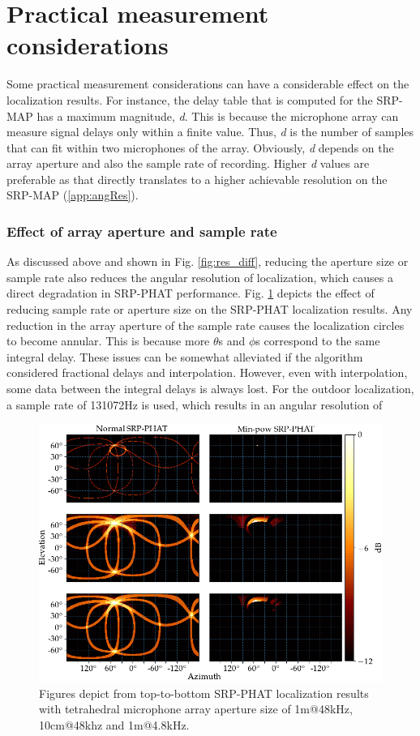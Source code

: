 \section{Practical measurement considerations}
Some practical measurement considerations can have a considerable effect on the localization results. For instance, the delay table that is computed for the SRP-MAP has a maximum magnitude, \textit{d}. This is because the microphone array can measure signal delays only within a finite value. Thus, \textit{d} is the number of samples that can fit within two microphones of the array. Obviously, \textit{d} depends on the array aperture and also the sample rate of recording. Higher \textit{d} values are preferable as that directly translates to a higher achievable resolution on the SRP-MAP (\ref{app:angRes}).
\subsubsection{Effect of array aperture and sample rate}
As discussed above and shown in Fig. \ref{fig:res_diff}, reducing the aperture size or sample rate also reduces the angular resolution of localization, which causes a direct degradation in SRP-PHAT performance. Fig. \ref{fig:4mic1srcAper} depicts the effect of reducing sample rate or aperture size on the SRP-PHAT localization results. Any reduction in the array aperture of the sample rate causes the localization circles to become annular. This is because more $\theta$s and $\phi$s correspond to the same integral delay. These issues can be somewhat alleviated if the algorithm considered fractional delays and interpolation. However, even with interpolation, some data between the integral delays is always lost. For the outdoor localization, a sample rate of 131072Hz is used, which results in an angular resolution of 
\begin{figure}[H]
    \centering
    \includegraphics[width=\textwidth]{Figures/aperSampSim.png}
    \caption{Figures depict from top-to-bottom SRP-PHAT localization results with tetrahedral microphone array aperture size of 1m@48kHz, 10cm@48khz and 1m@4.8kHz.}
    \label{fig:4mic1srcAper}
\end{figure}
